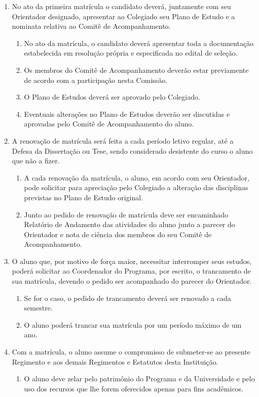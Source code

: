 \documentclass{article}
\newcommand{\singleitem}{\item[Parágrafo Único.]}
\begin{document}
\begin{enumerate}
	\item No ato da primeira matrícula o candidato deverá, juntamente com seu Orientador designado, apresentar ao Colegiado seu Plano de Estudo e a nominata relativa ao Comitê de Acompanhamento.
	\begin{enumerate}
		\item No ato da matrícula, o candidato deverá apresentar toda a documentação estabelecida em resolução própria e especificada no edital de seleção.
		\item Os membros do Comitê de Acompanhamento deverão estar previamente de acordo com a participação nesta Comissão.
		\item O Plano de Estudos deverá ser aprovado pelo Colegiado.
		\item Eventuais alterações no Plano de Estudos deverão ser discutidas e aprovadas pelo Comitê de Acompanhamento do aluno.
	\end{enumerate}

	\item A renovação de matrícula será feita a cada período letivo regular, até a Defesa da Dissertação ou Tese, sendo considerado desistente do curso o aluno que não a fizer.
	\begin{enumerate}
		\item A cada renovação da matrícula, o aluno, em acordo com seu Orientador, pode solicitar para apreciação pelo Colegiado a alteração das disciplinas previstas no Plano de Estudo original.
		\item Junto ao pedido de renovação de matrícula deve ser encaminhado Relatório de Andamento das atividades do aluno junto a parecer do Orientador e nota de ciência dos membros do seu Comitê de Acompanhamento.
	\end{enumerate}

	\item O aluno que, por motivo de força maior, necessitar interromper seus estudos, poderá solicitar ao Coordenador do Programa, por escrito, o trancamento de sua matrícula, devendo o pedido ser acompanhado do parecer do Orientador.
	\begin{enumerate}
		\item Se for o caso, o pedido de trancamento deverá ser renovado a cada semestre.
		\item O aluno poderá trancar sua matrícula por um período máximo de um ano.
	\end{enumerate}

	\item Com a matrícula, o aluno assume o compromisso de submeter-se ao presente Regimento e aos demais Regimentos e Estatutos desta Instituição.
	\begin{enumerate}
		\singleitem O aluno deve zelar pelo patrimônio do Programa e da Universidade e pelo uso dos recursos que lhe forem oferecidos apenas para fins acadêmicos.
	\end{enumerate}
\end{enumerate}
\end{document}
